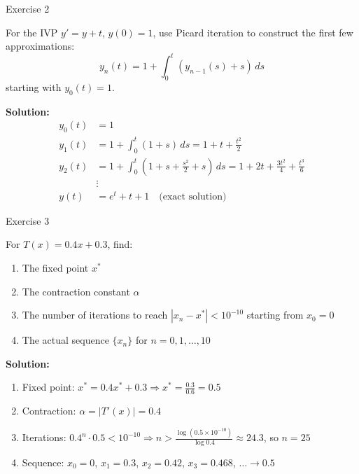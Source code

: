 \documentclass[aspectratio=169,10pt]{beamer}
\newenvironment{exercise}{\begin{definition}[Exercise]}{\end{definition}}
\begin{document}
\begin{frame}{Exercise 2}
    \begin{exercise}
        For the IVP $y' = y + t$, $y(0) = 1$, use Picard iteration to construct
        the first few approximations:
        \[
            y_n(t) = 1 + \int_0^t (y_{n-1}(s) + s) \, ds
        \]
        starting with $y_0(t) = 1$.
    \end{exercise}

    \vspace{0.3cm}
    \textbf{Solution:}
    \begin{align*}
        y_0(t) &= 1 \\
        y_1(t) &= 1 + \int_0^t (1 + s) \, ds = 1 + t + \frac{t^2}{2} \\
        y_2(t) &= 1 + \int_0^t (1 + s + \frac{s^2}{2} + s) \, ds = 1 + 2t + \frac{3t^2}{4} + \frac{t^3}{6} \\
        &\vdots \\
        y(t) &= e^t + t + 1 \quad \text{(exact solution)}
    \end{align*}
\end{frame}

\begin{frame}{Exercise 3}
    \begin{exercise}
        For $T(x) = 0.4x + 0.3$, find:
        \begin{enumerate}
            \item The fixed point $x^*$
            \item The contraction constant $\alpha$
            \item The number of iterations to reach $|x_n - x^*| < 10^{-10}$ starting from $x_0 = 0$
            \item The actual sequence $\{x_n\}$ for $n = 0, 1, \ldots, 10$
        \end{enumerate}
    \end{exercise}

    \vspace{0.3cm}
    \textbf{Solution:}
    \begin{enumerate}
        \item Fixed point: $x^* = 0.4x^* + 0.3 \Rightarrow x^* = \frac{0.3}{0.6} = 0.5$
        \item Contraction: $\alpha = |T'(x)| = 0.4$
        \item Iterations: $0.4^n \cdot 0.5 < 10^{-10} \Rightarrow n > \frac{\log(0.5 \times 10^{-10})}{\log 0.4} \approx 24.3$, so $n = 25$
        \item Sequence: $x_0 = 0$, $x_1 = 0.3$, $x_2 = 0.42$, $x_3 = 0.468$, $\ldots \to 0.5$
    \end{enumerate}
\end{frame}
\end{document}
